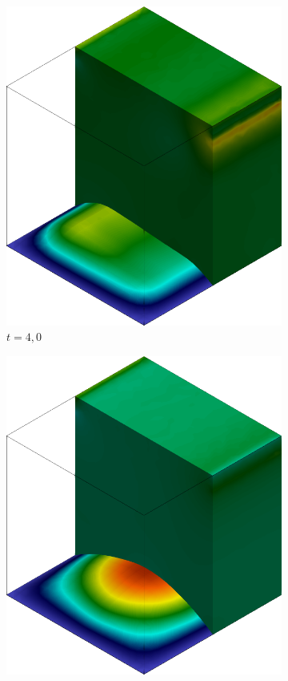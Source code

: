 \begin{figure}[h!]
    \centering
    \caption{Cavidade tridimensional - Campo de pressões na cavidade.}
    \begin{subfigure}[b]{0.35\textwidth}
        \includegraphics[width=\linewidth]{Figuras/FSI-Cavity3D/p4.png}
        \caption{$t=4,0$}
    \end{subfigure}
    \begin{subfigure}[b]{0.35\textwidth}
        \includegraphics[width=\linewidth]{Figuras/FSI-Cavity3D/p6.png}

\end{subfigure}
\end{figure}
